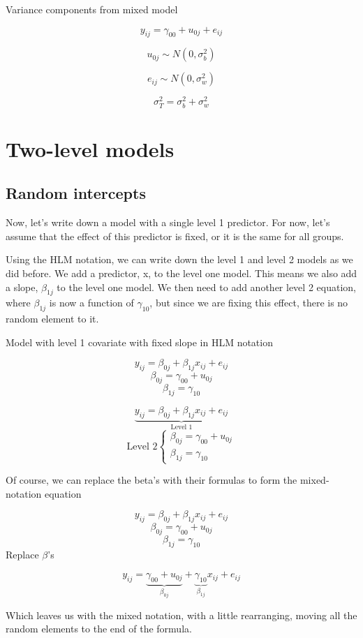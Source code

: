 Variance components from mixed model

\[
y_{ij} = \gamma_{00}+u_{0j}+e_{ij}
\]

\[
u_{0j} \sim N\left(0, \sigma_b^2\right)
\]

\[
e_{ij} \sim N\left(0, \sigma_w^2\right)
\]

\[
\sigma_T^2 = \sigma_b^2+\sigma_w^2
\]

\section{Two-level models}

\subsection{Random intercepts}

Now, let's write down a model with a single level 1 predictor.  For now, let's assume that the effect of this predictor is fixed, or it is the same for all groups.

Using the HLM notation, we can write down the level 1 and level 2 models as we did before. We add a predictor, x, to the level one model. This means we also add a slope, $\beta_{1j}$ to the level one model. We then need to add another level 2 equation, where $\beta_{1j}$ is now a function of $\gamma_{10}$, but since we are fixing this effect, there is no random element to it.

Model with level 1 covariate with fixed slope in HLM notation

\[
y_{ij} = \beta_{0j}+\beta_{1j}x_{ij}+e_{ij}
\]
\[
\beta_{0j} = \gamma_{00}+u_{0j}
\]
\[
\beta_{1j} = \gamma_{10}
\]

\[
\underbrace{y_{ij} = \beta_{0j}+\beta_{1j}x_{ij}+e_{ij}}_{\text{Level 1}}
\]
\[
\mbox{Level 2}
\begin{cases}
    \beta_{0j} = \gamma_{00}+u_{0j}  \\
    \beta_{1j} = \gamma_{10}
\end{cases}
\]

Of course, we can replace the beta's with their formulas to form the mixed-notation equation

\[
y_{ij} = \beta_{0j}+\beta_{1j}x_{ij}+e_{ij}
\]
\[
\beta_{0j} = \gamma_{00}+u_{0j}
\]
\[
\beta_{1j} = \gamma_{10}
\]
Replace $\beta$'s

\[
y_{ij} = \underbrace{\gamma_{00}+u_{0j}}_{\beta_{0j}}+\underbrace{\gamma_{10}}_{\beta_{1j}}x_{ij}+e_{ij}
\]

Which leaves us with the mixed notation, with a little rearranging, moving all the random elements to the end of the formula.

